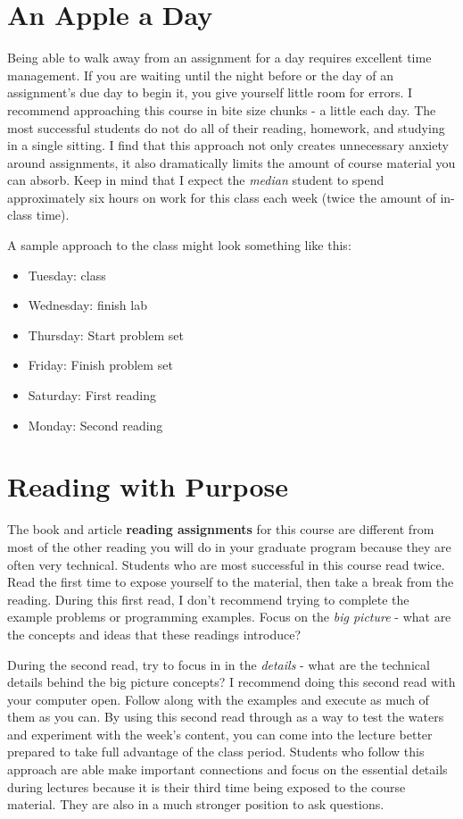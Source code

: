 \documentclass[]{book}
\providecommand{\tightlist}{%
  \setlength{\itemsep}{0pt}\setlength{\parskip}{0pt}}
\begin{document}
\section{An Apple a Day}\label{an-apple-a-day}

Being able to walk away from an assignment for a day requires excellent
time management. If you are waiting until the night before or the day of
an assignment's due day to begin it, you give yourself little room for
errors. I recommend approaching this course in bite size chunks - a
little each day. The most successful students do not do all of their
reading, homework, and studying in a single sitting. I find that this
approach not only creates unnecessary anxiety around assignments, it
also dramatically limits the amount of course material you can absorb.
Keep in mind that I expect the \emph{median} student to spend
approximately six hours on work for this class each week (twice the
amount of in-class time).

A sample approach to the class might look something like this:

\begin{itemize}
\tightlist
\item
  Tuesday: class
\item
  Wednesday: finish lab
\item
  Thursday: Start problem set
\item
  Friday: Finish problem set
\item
  Saturday: First reading
\item
  Monday: Second reading
\end{itemize}

\section{Reading with Purpose}\label{reading-with-purpose}

The book and article \textbf{reading assignments} for this course are
different from most of the other reading you will do in your graduate
program because they are often very technical. Students who are most
successful in this course read twice. Read the first time to expose
yourself to the material, then take a break from the reading. During
this first read, I don't recommend trying to complete the example
problems or programming examples. Focus on the \emph{big picture} - what
are the concepts and ideas that these readings introduce?

During the second read, try to focus in in the \emph{details} - what are
the technical details behind the big picture concepts? I recommend doing
this second read with your computer open. Follow along with the examples
and execute as much of them as you can. By using this second read
through as a way to test the waters and experiment with the week's
content, you can come into the lecture better prepared to take full
advantage of the class period. Students who follow this approach are
able make important connections and focus on the essential details
during lectures because it is their third time being exposed to the
course material. They are also in a much stronger position to ask
questions.
\end{document}

